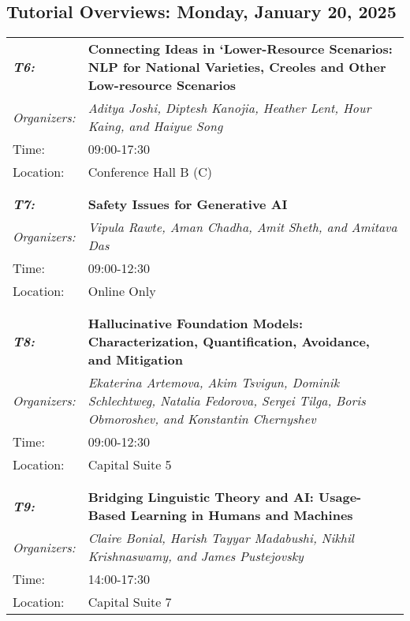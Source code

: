 \subsection{Tutorial Overviews: Monday, January 20, 2025}
\begin{longtable}{p{15mm}p{100mm}}
\emph{\textbf{T6:}} & \textbf{Connecting Ideas in ‘Lower-Resource Scenarios: NLP for National Varieties, Creoles and Other Low-resource Scenarios} \\
\emph{Organizers:} & \emph{Aditya Joshi, Diptesh Kanojia, Heather Lent, Hour Kaing, and Haiyue Song} \\
Time: & 09:00-17:30 \\
Location: & Conference Hall B (C) \\\\
\hline\\
\emph{\textbf{T7:}} & \textbf{Safety Issues for Generative AI} \\
\emph{Organizers:} & \emph{Vipula Rawte, Aman Chadha, Amit Sheth, and Amitava Das} \\
Time: & 09:00-12:30 \\
Location: & Online Only \\\\
\hline\\
\emph{\textbf{T8:}} & \textbf{Hallucinative Foundation Models: Characterization, Quantification, Avoidance, and Mitigation} \\
\emph{Organizers:} & \emph{Ekaterina Artemova, Akim Tsvigun, Dominik Schlechtweg, Natalia Fedorova, Sergei Tilga, Boris Obmoroshev, and Konstantin Chernyshev} \\
Time: & 09:00-12:30 \\
Location: & Capital Suite 5 \\\\
\hline\\
\emph{\textbf{T9:}} & \textbf{Bridging Linguistic Theory and AI: Usage-Based Learning in Humans and Machines} \\
\emph{Organizers:} & \emph{Claire Bonial, Harish Tayyar Madabushi, Nikhil Krishnaswamy, and James Pustejovsky} \\
Time: & 14:00-17:30 \\
Location: & Capital Suite 7 \\
\end{longtable}